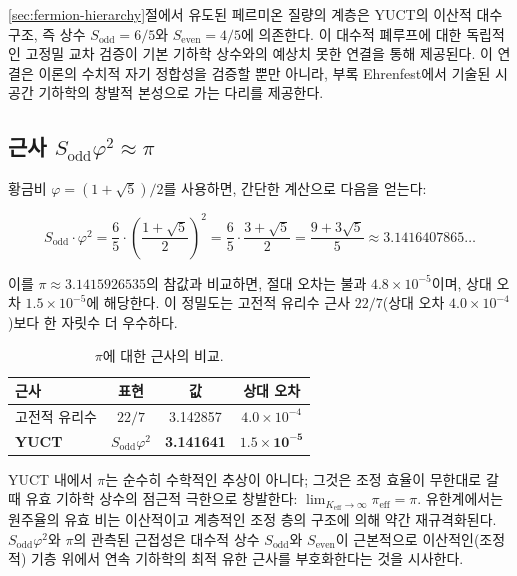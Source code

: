 \documentclass[11pt,a4paper]{article}
\theoremstyle{remark}
\begin{document}
	\ref{sec:fermion-hierarchy}절에서 유도된 페르미온 질량의 계층은 YUCT의 이산적 대수 구조, 즉 상수 \(S_{\mathrm{odd}} = 6/5\)와 \(S_{\mathrm{even}} = 4/5\)에 의존한다. 이 대수적 폐루프에 대한 독립적인 고정밀 교차 검증이 기본 기하학 상수와의 예상치 못한 연결을 통해 제공된다. 이 연결은 이론의 수치적 자기 정합성을 검증할 뿐만 아니라, 부록 Ehrenfest에서 기술된 시공간 기하학의 창발적 본성으로 가는 다리를 제공한다.
	
	\subsection{근사 \(S_{\mathrm{odd}} \varphi^2 \approx \pi\)}
	
	황금비 \(\varphi = (1+\sqrt{5})/2\)를 사용하면, 간단한 계산으로 다음을 얻는다:
	
	\begin{equation}
		S_{\mathrm{odd}} \cdot \varphi^2 = \frac{6}{5} \cdot \left(\frac{1+\sqrt{5}}{2}\right)^2 
		= \frac{6}{5} \cdot \frac{3+\sqrt{5}}{2} 
		= \frac{9 + 3\sqrt{5}}{5} \approx 3.1416407865\dots
	\end{equation}
	
	이를 \(\pi \approx 3.1415926535\)의 참값과 비교하면, 절대 오차는 불과 \(4.8 \times 10^{-5}\)이며, 상대 오차 \(1.5 \times 10^{-5}\)에 해당한다. 이 정밀도는 고전적 유리수 근사 \(22/7\)(상대 오차 \(4.0 \times 10^{-4}\))보다 한 자릿수 더 우수하다.
	
	\begin{table}[htbp]
		\centering
		\caption{\(\pi\)에 대한 근사의 비교.}
		\label{tab:pi_approx}
		\begin{tabular}{lccc}
			\toprule
			\textbf{근사} & \textbf{표현} & \textbf{값} & \textbf{상대 오차} \\
			\midrule
			고전적 유리수 & \(22/7\) & 3.142857 & \(4.0 \times 10^{-4}\) \\
			\textbf{YUCT} & \(S_{\mathrm{odd}}\varphi^2\) & \textbf{3.141641} & \(\mathbf{1.5 \times 10^{-5}}\) \\
			\bottomrule
		\end{tabular}
	\end{table}
	
	YUCT 내에서 \(\pi\)는 순수히 수학적인 추상이 아니다; 그것은 조정 효율이 무한대로 갈 때 유효 기하학 상수의 점근적 극한으로 창발한다: \(\lim_{K_{\mathrm{eff}} \to \infty} \pi_{\mathrm{eff}} = \pi\). 유한계에서는 원주율의 유효 비는 이산적이고 계층적인 조정 층의 구조에 의해 약간 재규격화된다. \(S_{\mathrm{odd}}\varphi^2\)와 \(\pi\)의 관측된 근접성은 대수적 상수 \(S_{\mathrm{odd}}\)와 \(S_{\mathrm{even}}\)이 근본적으로 이산적인(조정적) 기층 위에서 연속 기하학의 최적 유한 근사를 부호화한다는 것을 시사한다.
	
\end{document}

